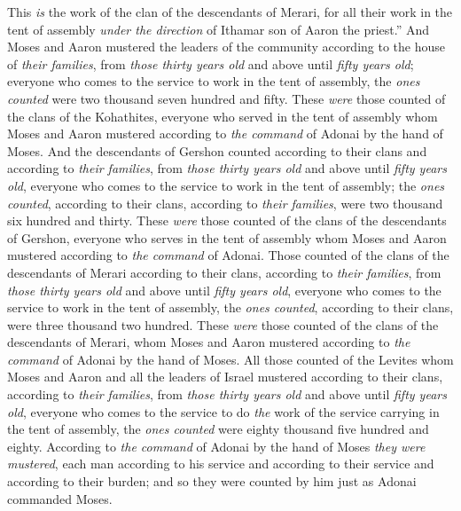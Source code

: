 \begin{biblechapter}
\verse This \textit{is} the work of the clan of the descendants of Merari, for all their work in the tent of assembly \textit{under the direction} of Ithamar son of Aaron the priest.”
\verse And Moses and Aaron mustered the leaders of the community according to the house of \textit{their families},
\verse from \textit{those thirty years old} and above until \textit{fifty years old}; everyone who comes to the service to work in the tent of assembly,
\verse the \textit{ones counted} were two thousand seven hundred and fifty.
\verse These \textit{were} those counted of the clans of the Kohathites, everyone who served in the tent of assembly whom Moses and Aaron mustered according to \textit{the command} of Adonai by the hand of Moses.
\verse And the descendants of Gershon counted according to their clans and according to \textit{their families},
\verse from \textit{those thirty years old} and above until \textit{fifty years old}, everyone who comes to the service to work in the tent of assembly;
\verse the \textit{ones counted}, according to their clans, according to \textit{their families}, were two thousand six hundred and thirty.
\verse These \textit{were} those counted of the clans of the descendants of Gershon, everyone who serves in the tent of assembly whom Moses and Aaron mustered according to \textit{the command} of Adonai.
\verse Those counted of the clans of the descendants of Merari according to their clans, according to \textit{their families},
\verse from \textit{those thirty years old} and above until \textit{fifty years old}, everyone who comes to the service to work in the tent of assembly,
\verse the \textit{ones counted}, according to their clans, were three thousand two hundred.
\verse These \textit{were} those counted of the clans of the descendants of Merari, whom Moses and Aaron mustered according to \textit{the command} of Adonai by the hand of Moses.
\verse All those counted of the Levites whom Moses and Aaron and all the leaders of Israel mustered according to their clans, according to \textit{their families},
\verse from \textit{those thirty years old} and above until \textit{fifty years old}, everyone who comes to the service to do \textit{the} work of the service carrying in the tent of assembly,
\verse the \textit{ones counted} were eighty thousand five hundred and eighty.
\verse According to \textit{the command} of Adonai by the hand of Moses \textit{they were mustered}, each man according to his service and according to their service and according to their burden; and so they were counted by him just as Adonai commanded Moses.
\end{biblechapter}

